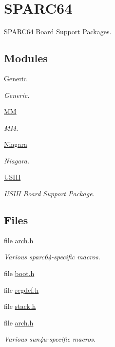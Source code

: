 \hypertarget{group__RTEMSBSPsSPARC64}{}\section{S\+P\+A\+R\+C64}
\label{group__RTEMSBSPsSPARC64}


S\+P\+A\+R\+C64 Board Support Packages.  


\subsection*{Modules}
\begin{DoxyCompactItemize}
\item 
\mbox{\hyperlink{group__RTEMSBSPsSPARC64Generic}{Generic}}
\begin{DoxyCompactList}\small\item\em Generic. \end{DoxyCompactList}\item 
\mbox{\hyperlink{group__RTEMSBSPsSPARC64mm}{MM}}
\begin{DoxyCompactList}\small\item\em MM. \end{DoxyCompactList}\item 
\mbox{\hyperlink{group__RTEMSBSPsSPARC64Niagara}{Niagara}}
\begin{DoxyCompactList}\small\item\em Niagara. \end{DoxyCompactList}\item 
\mbox{\hyperlink{group__RTEMSBSPsSPARC64USIII}{U\+S\+I\+II}}
\begin{DoxyCompactList}\small\item\em U\+S\+I\+II Board Support Package. \end{DoxyCompactList}\end{DoxyCompactItemize}
\subsection*{Files}
\begin{DoxyCompactItemize}
\item 
file \mbox{\hyperlink{arch_8h}{arch.\+h}}
\begin{DoxyCompactList}\small\item\em Various sparc64-\/specific macros. \end{DoxyCompactList}\item 
file \mbox{\hyperlink{sparc64_2include_2arch_2boot_8h}{boot.\+h}}
\item 
file \mbox{\hyperlink{regdef_8h}{regdef.\+h}}
\item 
file \mbox{\hyperlink{bsps_2sparc64_2include_2arch_2stack_8h}{stack.\+h}}
\item 
file \mbox{\hyperlink{sun4u_2arch_8h}{arch.\+h}}
\begin{DoxyCompactList}\small\item\em Various sun4u-\/specific macros. \end{DoxyCompactList}\end{DoxyCompactItemize}
